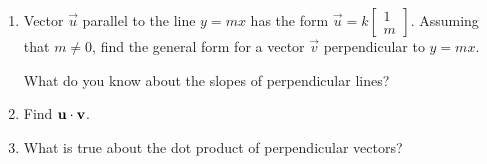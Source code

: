 \documentclass{ximera}
\begin{document}
    
 
 


\begin{problem}\label{prob:perpvectors3}
  \begin{enumerate}
    \item Vector $\vec{u}$ parallel to the line $y=mx$ has the form $\vec{u}=k\begin{bmatrix}1\\m\end{bmatrix}$.  Assuming that $m\neq 0$, find the general form for a vector $\vec{v}$ perpendicular to $y=mx$.
      \begin{hint}
        What do you know about the slopes of perpendicular
        lines?
      \end{hint}
    \item Find $\mathbf{u}\cdot \mathbf{v}$.
    \item What is true about the dot product of perpendicular vectors?
  \end{enumerate}
\end{problem}
\end{document}
